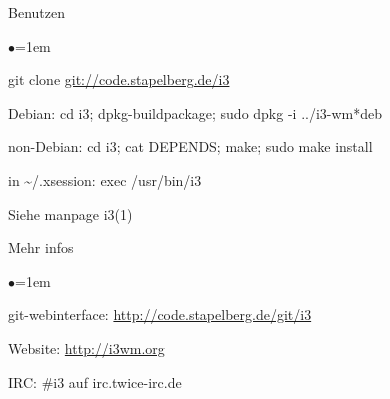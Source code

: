 \documentclass[mode=print,paper=screen,style=jefka]{powerdot}
\begin{document}
\begin{slide}{Benutzen}
\begin{list}{$\bullet$}{\itemsep=1em}
	\item git clone \url{git://code.stapelberg.de/i3}
	\item Debian: cd i3; dpkg-buildpackage; sudo dpkg -i ../i3-wm*deb
	\item non-Debian: cd i3; cat DEPENDS; make; sudo make install
	\item in \~{}/.xsession: exec /usr/bin/i3
	\item Siehe manpage i3(1)
\end{list}
\end{slide}

\begin{slide}{Mehr infos}
\begin{list}{$\bullet$}{\itemsep=1em}
	\item git-webinterface: \url{http://code.stapelberg.de/git/i3}
	\item Website: \url{http://i3wm.org}
	\item IRC: \#i3 auf irc.twice-irc.de
\end{list}
\end{slide}
\end{document}
